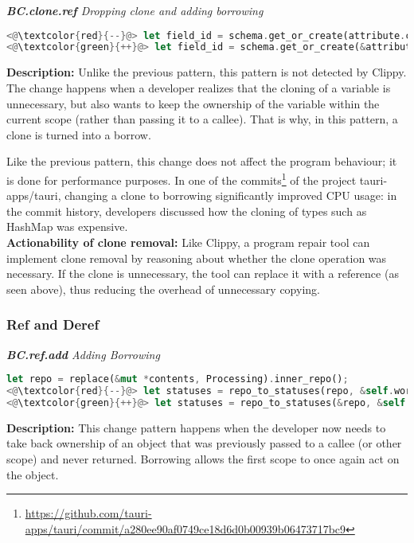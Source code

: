 \noindent\textit{\textbf{BC.clone.ref} Dropping clone and adding borrowing}

\begin{lstlisting}[language=Rust, style=colouredRust]
<@\textcolor{red}{--}@> let field_id = schema.get_or_create(attribute.clone())?;
<@\textcolor{green}{++}@> let field_id = schema.get_or_create(&attribute)?;
\end{lstlisting}

\noindent\textbf{Description:} Unlike the previous pattern, this pattern is not detected by Clippy. The change happens when a developer realizes that the cloning of a variable is unnecessary, but also wants to keep the ownership of the variable within the current scope (rather than passing it to a callee). That is why, in this pattern, a clone is turned into a borrow. 

Like the previous pattern, this change does not affect the program behaviour; it is done for performance purposes. In one of the commits\footnote{\scriptsize \url{https://github.com/tauri-apps/tauri/commit/a280ee90af0749ce18d6d0b00939b06473717bc9}} of the project tauri-apps/tauri, changing a clone to borrowing significantly improved CPU usage: in the commit history, developers discussed how the cloning of types such as HashMap was expensive. \\

\noindent\textbf{Actionability of clone removal:} Like Clippy, a program repair tool can implement clone removal by reasoning about whether the clone operation was necessary. If the clone is unnecessary, the tool can replace it with a reference (as seen above), thus reducing the overhead of unnecessary copying. \\

\subsubsection{Ref and Deref}

\noindent\textit{\textbf{BC.ref.add} Adding Borrowing}

\begin{lstlisting}[language=Rust, style=colouredRust]
let repo = replace(&mut *contents, Processing).inner_repo();
<@\textcolor{red}{--}@> let statuses = repo_to_statuses(repo, &self.workdir);
<@\textcolor{green}{++}@> let statuses = repo_to_statuses(&repo, &self.workdir);
\end{lstlisting}

\noindent\textbf{Description:} This change pattern happens when the developer now needs to take back ownership of an object that was previously passed to a callee (or other scope) and never returned. Borrowing allows the first scope to once again act on the object.

